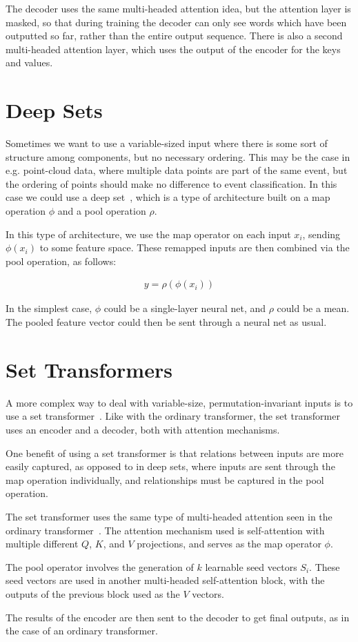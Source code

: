 The decoder uses the same multi-headed attention idea, but the attention layer is masked, so that during training the decoder can only see words which have been outputted so far, rather than the entire output sequence. There is also a second multi-headed attention layer, which uses the output of the encoder for the keys and values.

\section{Deep Sets}

Sometimes we want to use a variable-sized input where there is some sort of structure among components, but no necessary ordering. This may be the case in e.g. point-cloud data, where multiple data points are part of the same event, but the ordering of points should make no difference to event classification. In this case we could use a deep set~\cite{deep_sets}, which is a type of architecture built on a map operation $\phi$ and a pool operation $\rho$.

In this type of architecture, we use the map operator on each input $x_i$, sending $\phi(x_i)$ to some feature space. These remapped inputs are then combined via the pool operation, as follows:

\begin{align}
    y = \rho\left(\phi(x_i)\right)
\end{align}

In the simplest case, $\phi$ could be a single-layer neural net, and $\rho$ could be a mean. The pooled feature vector could then be sent through a neural net as usual.

\section {Set Transformers}

A more complex way to deal with variable-size, permutation-invariant inputs is to use a set transformer~\cite{set_transformer}. Like with the ordinary transformer, the set transformer uses an encoder and a decoder, both with attention mechanisms.

One benefit of using a set transformer is that relations between inputs are more easily captured, as opposed to in deep sets, where inputs are sent through the map operation individually, and relationships must be captured in the pool operation.

The set transformer uses the same type of multi-headed attention seen in the ordinary transformer~\cite{transformer}. The attention mechanism used is self-attention with multiple different $Q$, $K$, and $V$ projections, and serves as the map operator $\phi$.

The pool operator involves the generation of $k$ learnable seed vectors $S_i$. These seed vectors are used in another multi-headed self-attention block, with the outputs of the previous block used as the $V$ vectors.

The results of the encoder are then sent to the decoder to get final outputs, as in the case of an ordinary transformer.